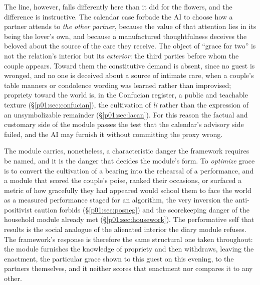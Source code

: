 The line, however, falls differently here than it did for the flowers, and the difference is instructive. The calendar case forbade the AI to choose how a partner attends to \emph{the other partner}, because the value of that attention lies in its being the lover's own, and because a manufactured thoughtfulness deceives the beloved about the source of the care they receive. The object of ``grace for two'' is not the relation's interior but its \emph{exterior}: the third parties before whom the couple appears. Toward them the constitutive demand is absent, since no guest is wronged, and no one is deceived about a source of intimate care, when a couple's table manners or condolence wording was learned rather than improvised; propriety toward the world is, in the Confucian register, a public and teachable texture (§\ref{p01:sec:confucian}), the cultivation of \emph{li} rather than the expression of an unsymbolizable remainder (§\ref{p01:sec:lacan}). For this reason the factual and customary side of the module passes the test that the calendar's advisory side failed, and the AI may furnish it without committing the proxy wrong.

The module carries, nonetheless, a characteristic danger the framework requires be named, and it is the danger that decides the module's form. To \emph{optimize} grace is to convert the cultivation of a bearing into the rehearsal of a performance, and a module that scored the couple's poise, ranked their occasions, or surfaced a metric of how gracefully they had appeared would school them to face the world as a measured performance staged for an algorithm, the very inversion the anti-positivist caution forbids (§\ref{p01:sec:posneg}) and the scorekeeping danger of the household module already met (§\ref{p01:sec:housework}). The performative self that results is the social analogue of the alienated interior the diary module refuses. The framework's response is therefore the same structural one taken throughout: the module furnishes the knowledge of propriety and then withdraws, leaving the enactment, the particular grace shown to this guest on this evening, to the partners themselves, and it neither scores that enactment nor compares it to any other.


